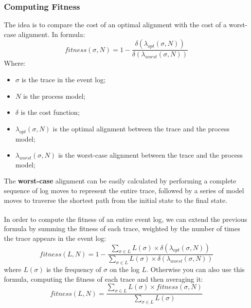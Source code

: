 \subsubsection*{Computing Fitness}
The idea is to compare the cost of an optimal alignment with the cost of a worst-case alignment.
In formula:
\begin{equation}
    fitness(\sigma, N) = 1 - \frac{\delta(\lambda_{opt}(\sigma, N))}{\delta(\lambda_{worst}(\sigma, N))}
\end{equation}
Where:
\begin{itemize}
    \item $\sigma$ is the trace in the event log;
    \item $N$ is the process model;
    \item $\delta$ is the cost function;
    \item $\lambda_{opt}(\sigma, N)$ is the optimal alignment between the trace and the process model;
    \item $\lambda_{worst}(\sigma, N)$ is the worst-case alignment between the trace and the process model;
\end{itemize}
The \textbf{worst-case} alignment can be easily calculated by performing a complete sequence of log moves to represent the entire trace, followed by a series of model moves to traverse the shortest path from the initial state to the final state.
\\\\In order to compute the fitness of an entire event log, we can extend the previous formula by summing the fitness of each trace, weighted by the number of times the trace appears in the event log:
\begin{equation}
    fitness(L, N) = 1 - \frac{\sum_{\sigma \in L} L(\sigma) \times \delta(\lambda_{opt}(\sigma, N))}{\sum_{\sigma \in L} L(\sigma) \times \delta(\lambda_{worst}(\sigma, N))}
\end{equation}
where $L(\sigma)$ is the frequency of $\sigma$ on the log $L$.
Otherwise you can also use this formula, computing the fitness of each trace and then averaging it:
\begin{equation}
    fitness(L, N) = \frac{\sum_{\sigma \in L} L(\sigma) \times fitness(\sigma, N)}{\sum_{\sigma \in L} L(\sigma)}
\end{equation}
